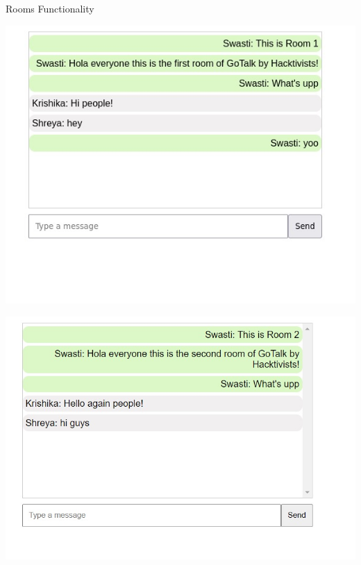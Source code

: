 \documentclass{beamer}
\begin{document}
\begin{frame}{Rooms Functionality}
        \begin{minipage}[t]{0.3\textwidth}
            \centering
            \includegraphics[width=\textwidth]{room1.jpg}
        \end{minipage}
        \hfill
        \begin{minipage}[t]{0.3\textwidth}
            \centering
            \includegraphics[width=\textwidth]{room2.jpg}
        \end{minipage}
        \hfill
        \begin{minipage}[t]{0.3\textwidth}
            \centering

\end{minipage}
\end{frame}
\end{document}
